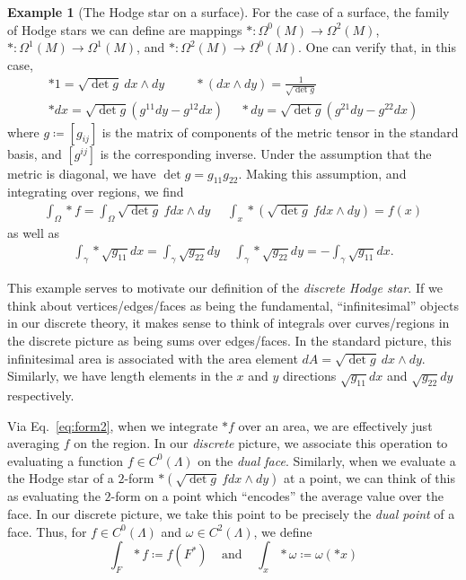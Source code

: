 \documentclass[aps,pra,showpacs,notitlepage,onecolumn,superscriptaddress,nofootinbib]{revtex4-1}
\theoremstyle{definition}
\newtheorem{example}{Example}[section]
\begin{document}
\begin{example}[The Hodge star on a surface]
  For the case of a surface, the family of Hodge stars we can define are mappings $* : \Omega^{0}(M) \rightarrow \Omega^{2}(M)$, $* : \Omega^{1}(M) \rightarrow \Omega^{1}(M)$, and $* : \Omega^{2}(M) \rightarrow \Omega^{0}(M)$.
  One can verify that, in this case,
  \begin{align}
    * 1 = \sqrt{\det g } \ dx \wedge dy \ \ \ \ \ \ \ \ \ \ \ * (dx \wedge dy) = \frac{1}{\sqrt{\det g }} \\
    * dx =  \sqrt{\det g } \left( g^{11} dy - g^{12} dx \right) \ \ \ \ \ \ * dy = \sqrt{\det g } \left( g^{21} dy - g^{22} dx \right)
  \end{align}
  where $g \coloneqq [g_{ij}]$ is the matrix of components of the metric tensor in the standard basis, and $[g^{ij}]$ is the corresponding inverse. Under the assumption that the metric is diagonal, we have
  $\det g = g_{11} g_{22}$. Making this assumption, and integrating over regions, we find
  \begin{align}
    \label{eq:form2}
    \displaystyle\int_{\Omega} * f = \displaystyle\int_{\Omega} \sqrt{\det g} \ f dx \wedge dy \ \ \ \ \ \ \displaystyle\int_{x} * \left( \sqrt{\det g} \ f dx \wedge dy \right) = f(x)
  \end{align}
  as well as
  \begin{align}
    \label{eq:form}
    \displaystyle\int_{\gamma} * \sqrt{g_{11}} dx = \displaystyle\int_{\gamma} \sqrt{ g_{22}} dy \ \ \ \ \ \displaystyle\int_{\gamma} * \sqrt{g_{22}} dy = - \displaystyle\int_{\gamma} \sqrt{ g_{11}} dx.
  \end{align}
\end{example}

\noindent This example serves to motivate our definition of the \emph{discrete Hodge star}. If we think about vertices/edges/faces as being the fundamental, ``infinitesimal'' objects in our discrete theory,
it makes sense to think of integrals over curves/regions in the discrete picture as being sums over edges/faces. In the standard picture, this infinitesimal area is associated with the area element $dA = \sqrt{\det g} \ dx \wedge dy$.
Similarly, we have length elements in the $x$ and $y$ directions $\sqrt{g_{11}} dx$ and $\sqrt{g_{22}} dy$ respectively.

Via Eq.~\eqref{eq:form2}, when we integrate $* f$ over an area, we are effectively just averaging $f$ on the region. In our \emph{discrete} picture, we associate this operation to evaluating a function $f \in C^0(\Lambda)$
on the \emph{dual face}. Similarly, when we evaluate a the Hodge star of a $2$-form $* (\sqrt{\det g} \ f dx \wedge dy)$ at a point, we can think of this as evaluating the $2$-form on a point which ``encodes'' the average value
over the face. In our discrete picture, we take this point to be precisely the \emph{dual point} of a face. Thus, for $f \in C^{0}(\Lambda)$ and $\omega \in C^{2}(\Lambda)$, we define
\begin{equation}
  \int_{F} * f \coloneqq f(F^{*}) \ \ \ \ \ \text{and} \ \ \ \ \ \int_{x} * \omega \coloneqq \omega(* x)
\end{equation}
\end{document}
